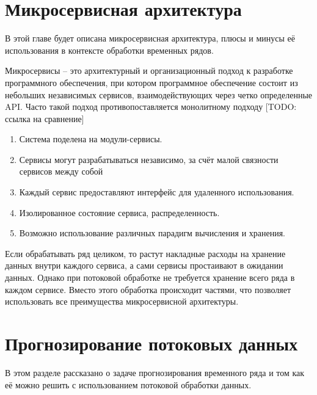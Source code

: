 \section{Микросервисная архитектура}
\begin{annotation}
	В этой главе будет описана микросервисная архитектура, плюсы и минусы её использования в контексте обработки временных рядов.
\end{annotation}

Микросервисы – это архитектурный и организационный подход к разработке программного обеспечения, при котором программное обеспечение состоит из небольших независимых сервисов, взаимодействующих через четко
определенные API. Часто такой подход противопоставляется монолитному подходу [TODO: ссылка на сравнение]

\begin{enumerate}
	\item Система поделена на модули-сервисы.
	\item Сервисы могут разрабатываться независимо, за счёт малой связности сервисов между собой
	\item Каждый сервис предоставляют интерфейс для удаленного использования.
	\item Изолированное состояние сервиса, распределенность.
	\item Возможно использование различных парадигм вычисления и хранения.
\end{enumerate}


Если обрабатывать ряд целиком, то растут накладные расходы на хранение данных внутри каждого сервиса, а сами сервисы простаивают в ожидании данных. 
Однако при потоковой обработке не требуется хранение всего ряда в каждом сервисе. Вместо этого обработка происходит частями, что позволяет использовать все преимущества микросервисной архитектуры.

\section{Прогнозирование потоковых данных}
\begin{annotation}
	В этом разделе рассказано о задаче прогнозирования временного ряда и том как её можно решить с использованием потоковой обработки данных.
\end{annotation}

